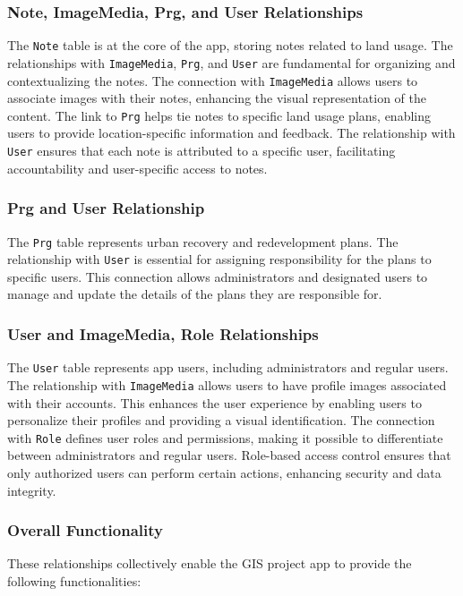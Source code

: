 \subsubsection{Note, ImageMedia, Prg, and User Relationships}
The \texttt{Note} table is at the core of the app, storing notes related to land usage. The relationships with \texttt{ImageMedia}, \texttt{Prg}, and \texttt{User} are fundamental for organizing and contextualizing the notes. The connection with \texttt{ImageMedia} allows users to associate images with their notes, enhancing the visual representation of the content. The link to \texttt{Prg} helps tie notes to specific land usage plans, enabling users to provide location-specific information and feedback. The relationship with \texttt{User} ensures that each note is attributed to a specific user, facilitating accountability and user-specific access to notes.

\subsubsection{Prg and User Relationship}
The \texttt{Prg} table represents urban recovery and redevelopment plans. The relationship with \texttt{User} is essential for assigning responsibility for the plans to specific users. This connection allows administrators and designated users to manage and update the details of the plans they are responsible for.

\subsubsection{User and ImageMedia, Role Relationships}
The \texttt{User} table represents app users, including administrators and regular users. The relationship with \texttt{ImageMedia} allows users to have profile images associated with their accounts. This enhances the user experience by enabling users to personalize their profiles and providing a visual identification. The connection with \texttt{Role} defines user roles and permissions, making it possible to differentiate between administrators and regular users. Role-based access control ensures that only authorized users can perform certain actions, enhancing security and data integrity.

\subsubsection{Overall Functionality}
These relationships collectively enable the GIS project app to provide the following functionalities:


